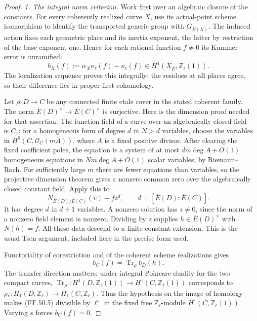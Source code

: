 \begin{proof}
\emph{1. The integral norm criterion.}
Work first over an algebraic closure of the constants.
For every coherently realized curve \(X\), use its
actual-point scheme isomorphism to identify the
transported generic group with \(G_{\overline E(X)}\).
The induced action fixes each geometric place and its
inertia exponent, the latter by restriction of the
base exponent one. Hence for each rational function
\(f\ne0\) its Kummer error is unramified:
\[
 b_X(f):=\alpha_X\kappa_\ell(f)-\kappa_\ell(f)
             \in H^1(X_{\overline E},\mathbb Z_\ell(1)).
                                                        \tag{FF.50.3}
\]
The localization sequence proves this integrally:
the residues at all places agree, so their difference
lies in proper first cohomology.

Let \(\rho:D\to C\) be any connected finite etale
cover in the stated coherent family. The norm
\(\overline E(D)^\times\to\overline E(C)^\times\)
is surjective. Here is the dimension proof needed for
that assertion. The function field of a curve over an
algebraically closed field is \(C_1\): for a
homogeneous form of degree \(d\) in \(N>d\) variables,
choose the variables in \(H^0(C,\mathcal O_C(mA))\),
where \(A\) is a fixed positive divisor. After clearing
the fixed coefficient poles, the equation is a system
of at most \(dm\deg A+O(1)\) homogeneous equations in
\(Nm\deg A+O(1)\) scalar variables, by Riemann--Roch.
For sufficiently large \(m\) there are fewer equations
than variables, so the projective dimension theorem
gives a nonzero common zero over the algebraically
closed constant field. Apply this to
\[
               N_{\overline E(D)/\overline E(C)}(v)-f z^d,
               \qquad d=[\overline E(D):\overline E(C)].
                                                        \tag{FF.50.4}
\]
It has degree \(d\) in \(d+1\) variables. A nonzero
solution has \(z\ne0\), since the norm of a nonzero
field element is nonzero. Dividing by \(z\) supplies
\(h\in\overline E(D)^\times\) with \(N(h)=f\).
All these data descend to a finite constant extension.
This is the usual Tsen argument, included here in the
precise form used.

Functoriality of corestriction and of the coherent
scheme realizations gives
\[
                   b_C(f)=\operatorname{Tr}_\rho b_D(h).
                                                        \tag{FF.50.5}
\]
The transfer direction matters: under integral
Poincare duality for the two compact curves,
\(\operatorname{Tr}_\rho:H^1(D,\mathbb Z_\ell(1))
\to H^1(C,\mathbb Z_\ell(1))\) corresponds to
\(\rho_*:H_1(D,\mathbb Z_\ell)\to
H_1(C,\mathbb Z_\ell)\). Thus the hypothesis on
the image of homology makes (FF.50.5) divisible by
\(\ell^s\) in the fixed free \(\mathbb Z_\ell\)-module
\(H^1(C,\mathbb Z_\ell(1))\). Varying \(s\) forces
\(b_C(f)=0\).


\end{proof}
